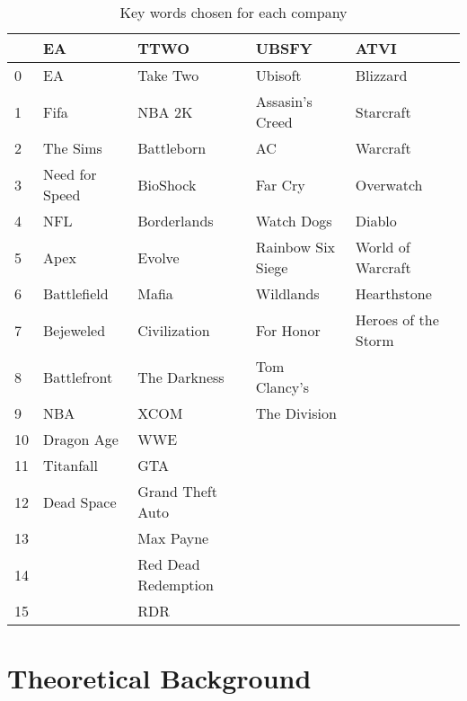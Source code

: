 \documentclass[11pt]{article} %
\begin{document}
\begin{table}[hbt!]
\centering
\caption{Key words chosen for each company}
\begin{tabular}{lllll}
\toprule
{} &              EA &                 TTWO &              UBSFY &                 ATVI \\
\midrule
0  &              EA &             Take Two &            Ubisoft &             Blizzard \\
1  &            Fifa &               NBA 2K &    Assasin's Creed &            Starcraft \\
2  &        The Sims &           Battleborn &                 AC &             Warcraft \\
3  &  Need for Speed &             BioShock &            Far Cry &            Overwatch \\
4  &             NFL &          Borderlands &         Watch Dogs &               Diablo \\
5  &            Apex &               Evolve &  Rainbow Six Siege &    World of Warcraft \\
6  &     Battlefield &                Mafia &          Wildlands &          Hearthstone \\
7  &       Bejeweled &         Civilization &          For Honor &  Heroes of the Storm \\
8  &     Battlefront &         The Darkness &       Tom Clancy's &                  \\
9  &             NBA &                 XCOM &       The Division &                  \\
10 &      Dragon Age &                  WWE &                &                  \\
11 &       Titanfall &                  GTA &                &                  \\
12 &      Dead Space &     Grand Theft Auto &                &                  \\
13 &             &            Max Payne &                &                  \\
14 &             &  Red Dead Redemption &                &                  \\
15 &             &                  RDR &                &                  \\
\bottomrule
\end{tabular}
\end{table}

\section{Theoretical Background}
\end{document}
